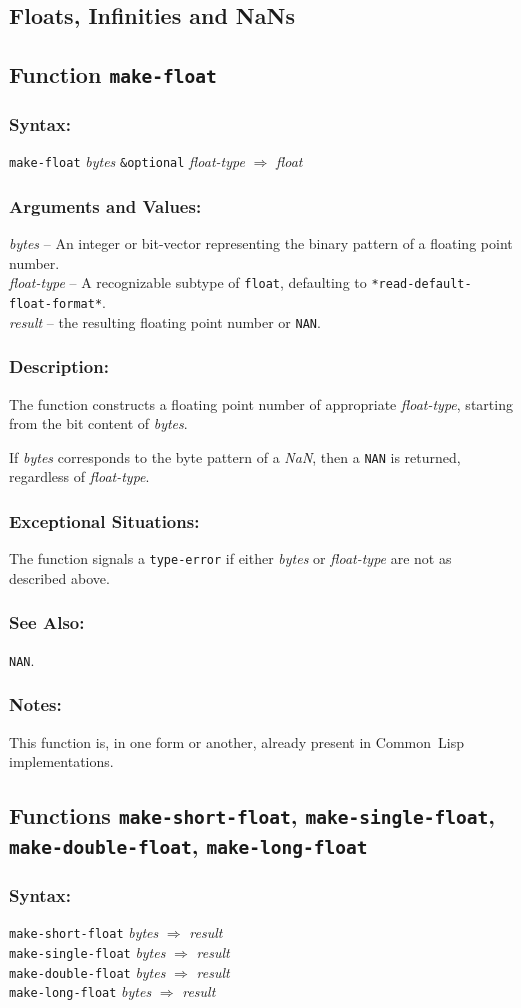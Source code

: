 \documentclass[10pt,fleqn]{article}
\newcommand{\CL}{\textsf{Common~Lisp}}
\newcommand{\code}[1]{\texttt{#1}}
\newcommand{\varname}[1]{\textit{#1}}
\newcommand{\DDictionaryItem}[1]{\vspace*{6pt}\noindent\hrulefill\vspace*{-9pt}\subsection*{#1}}
\newcommand{\DSyntax}{\subsubsection*{Syntax:}}
\newcommand{\DArgsNValues}{\subsubsection*{Arguments and Values:}}
\newcommand{\DDescription}{\subsubsection*{Description:}}
\newcommand{\DExceptional}{\subsubsection*{Exceptional Situations:}}
\newcommand{\DNotes}{\subsubsection*{Notes:}}
\newcommand{\DSeeAlso}{\subsubsection*{See Also:}}
\begin{document}
\subsection{Floats, Infinities and NaNs}

\DDictionaryItem{Function \code{make-float}}

\DSyntax{}

\code{make-float} \varname{bytes} \code{\&optional}
\varname{float-type}
$\Rightarrow$ \varname{float}

\DArgsNValues{}

\varname{bytes} -- An integer or bit-vector representing the binary
pattern of a floating point number.\\
\varname{float-type} -- A recognizable subtype of \code{float},
defaulting to \code{*read-default-float-format*}.\\
\varname{result} -- the resulting floating point number or \code{NAN}.


\DDescription{}

The function constructs a floating point number of appropriate
\varname{float-type}, starting from the bit content of
\varname{bytes}.

If \varname{bytes} corresponds to the byte pattern of a \emph{NaN},
then a \code{NAN} is returned, regardless of \varname{float-type}.

\DExceptional{}

The function signals a \code{type-error} if either \varname{bytes} or
\varname{float-type} are not as described above.

\DSeeAlso{}

\code{NAN}.


\DNotes{}

This function is, in one form or another, already present in \CL{}
implementations.


\DDictionaryItem{Functions
  \code{make-short-float},
  \code{make-single-float},\\
  \code{make-double-float},
  \code{make-long-float}}

\DSyntax{}

\code{make-short-float} \varname{bytes}
$\Rightarrow$ \varname{result}\\
\code{make-single-float} \varname{bytes}
$\Rightarrow$ \varname{result}\\
\code{make-double-float} \varname{bytes}
$\Rightarrow$ \varname{result}\\
\code{make-long-float} \varname{bytes}
$\Rightarrow$ \varname{result}
\end{document}
